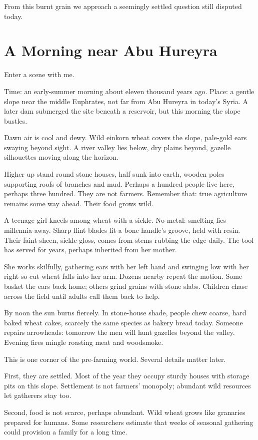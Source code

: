 From this burnt grain we approach a seemingly settled question still disputed today.

\section{A Morning near Abu Hureyra}
Enter a scene with me.

Time: an early-summer morning about eleven thousand years ago. Place: a gentle slope near the middle Euphrates, not far from Abu Hureyra in today's Syria. A later dam submerged the site beneath a reservoir, but this morning the slope bustles.

Dawn air is cool and dewy. Wild einkorn wheat covers the slope, pale-gold ears swaying beyond sight. A river valley lies below, dry plains beyond, gazelle silhouettes moving along the horizon.

Higher up stand round stone houses, half sunk into earth, wooden poles supporting roofs of branches and mud. Perhaps a hundred people live here, perhaps three hundred. They are not farmers. Remember that: true agriculture remains some way ahead. Their food grows wild.

A teenage girl kneels among wheat with a sickle. No metal: smelting lies millennia away. Sharp flint blades fit a bone handle's groove, held with resin. Their faint sheen, sickle gloss, comes from stems rubbing the edge daily. The tool has served for years, perhaps inherited from her mother.

She works skilfully, gathering ears with her left hand and swinging low with her right so cut wheat falls into her arm. Dozens nearby repeat the motion. Some basket the ears back home; others grind grains with stone slabs. Children chase across the field until adults call them back to help.

By noon the sun burns fiercely. In stone-house shade, people chew coarse, hard baked wheat cakes, scarcely the same species as bakery bread today. Someone repairs arrowheads: tomorrow the men will hunt gazelles beyond the valley. Evening fires mingle roasting meat and woodsmoke.

This is one corner of the pre-farming world. Several details matter later.

First, they are settled. Most of the year they occupy sturdy houses with storage pits on this slope. Settlement is not farmers' monopoly; abundant wild resources let gatherers stay too.

Second, food is not scarce, perhaps abundant. Wild wheat grows like granaries prepared for humans. Some researchers estimate that weeks of seasonal gathering could provision a family for a long time.


